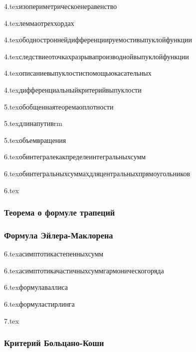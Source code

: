{4.tex}{изопериметрическоенеравенство}

{4.tex}{леммаотреххордах}

{4.tex}{ободностроннейдифференциируемостивыпуклойфункции}

{4.tex}{следствиеоточкахразрывапроизводнойвыпуклойфункции}

{4.tex}{описаниевыпуклостиспомощьюкасательных}

{4.tex}{дифференциальныйкритерийвыпуклости}

{5.tex}{обобщеннаятеоремаоплотности}

{5.tex}{длинапутивrm}

{5.tex}{объемвращения}

{6.tex}{обинтегралекакпределеинтегральныхсумм}

{6.tex}{обинтегральныхсуммахдляцентральныхпрямоугольников}

{6.tex}{}
\subsubsection{Теорема о формуле трапеций}
\subsubsection{Формула Эйлера-Маклорена}

{6.tex}{асимптотикастепенныхсумм}

{6.tex}{асимптотикачастичныхсуммгармоническогоряда}

{6.tex}{формулаваллиса}

{6.tex}{формуластирлинга}

{7.tex}{}
\subsubsection*{Критерий Больцано-Коши}


